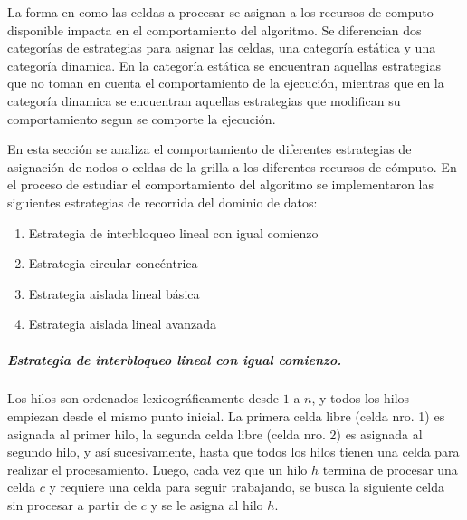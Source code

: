 \documentclass[a4paper,11pt]{book}
\begin{document}
La forma en como las celdas a procesar se asignan a los recursos de computo disponible impacta en el comportamiento del algoritmo. Se diferencian dos categorías de estrategias para asignar las celdas, una categoría estática y una categoría dinamica. En la categoría estática se encuentran aquellas estrategias que no toman en cuenta el comportamiento de la ejecución, mientras que en la categoría dinamica se encuentran aquellas estrategias que modifican su comportamiento segun se comporte la ejecución.


En esta sección se analiza el comportamiento de diferentes estrategias de asignación de nodos o celdas de la grilla a los diferentes recursos de cómputo.\newline
En el proceso de estudiar el comportamiento del algoritmo se implementaron las siguientes estrategias de recorrida del dominio de datos:
\begin{enumerate}
	\item Estrategia de interbloqueo lineal con igual comienzo
	\item Estrategia circular con\-céntrica
	\item Estrategia aislada lineal básica
	\item Estrategia aislada lineal avanzada
\end{enumerate}

\subparagraph{Estrategia de interbloqueo lineal con igual comienzo.}
Los hilos son ordenados lexicográficamente desde $1$ a $n$, y todos los hilos empiezan desde el mismo punto inicial. La primera celda libre (celda nro. 1) es asignada al primer hilo, la segunda celda libre (celda nro. 2) es asignada al segundo hilo, y así sucesivamente, hasta que todos los hilos tienen una celda para realizar el procesamiento. Luego, cada vez que un hilo $h$ termina de procesar una celda $c$ y requiere una celda para seguir trabajando, se busca la siguiente celda sin procesar a partir de $c$ y se le asigna al hilo $h$.
\end{document}
